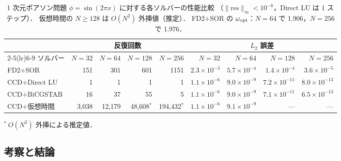 \begin{table}[htbp]
  \centering
  \caption{%
    1 次元ポアソン問題 $\phi = \sin(2\pi x)$ に対する各ソルバーの性能比較
    （$\|\mathrm{res}\|_\infty < 10^{-8}$，Direct LU は 1 ステップ）．
    仮想時間の $N \geq 128$ は $O(N^2)$ 外挿値（推定）．
    FD2$+$SOR の $\omega_{\rm opt}$：$N=64$ で 1.906，$N=256$ で 1.976．}
  \label{tab:ccd_solver_benchmark}
  \begin{tabular}{lrrrrrrrr}
    \toprule
    & \multicolumn{4}{c}{反復回数} & \multicolumn{4}{c}{$L_2$ 誤差} \\
    \cmidrule(lr){2-5}\cmidrule(lr){6-9}
    ソルバー & $N=32$ & $N=64$ & $N=128$ & $N=256$
             & $N=32$ & $N=64$ & $N=128$ & $N=256$ \\
    \midrule
    FD2$+$SOR
      & 151 & 301 & 601 & 1151
      & $2.3\times10^{-3}$ & $5.7\times10^{-4}$ & $1.4\times10^{-4}$ & $3.6\times10^{-5}$ \\
    CCD$+$Direct LU
      & 1 & 1 & 1 & 1
      & $1.1\times10^{-6}$ & $9.0\times10^{-9}$ & $7.2\times10^{-11}$ & $8.0\times10^{-13}$ \\
    CCD$+$BiCGSTAB
      & 16 & 37 & 55 & 5
      & $1.1\times10^{-6}$ & $9.0\times10^{-9}$ & $7.1\times10^{-11}$ & $6.5\times10^{-13}$ \\
    CCD$+$仮想時間
      & 3,038 & 12,179 & 48,608$^*$ & 194,432$^*$
      & $1.1\times10^{-6}$ & $9.1\times10^{-9}$ & — & — \\
    \bottomrule
  \end{tabular}
  \par\smallskip
  \footnotesize ${}^*\ O(N^2)$ 外挿による推定値．
\end{table}

\subsection{考察と結論}

